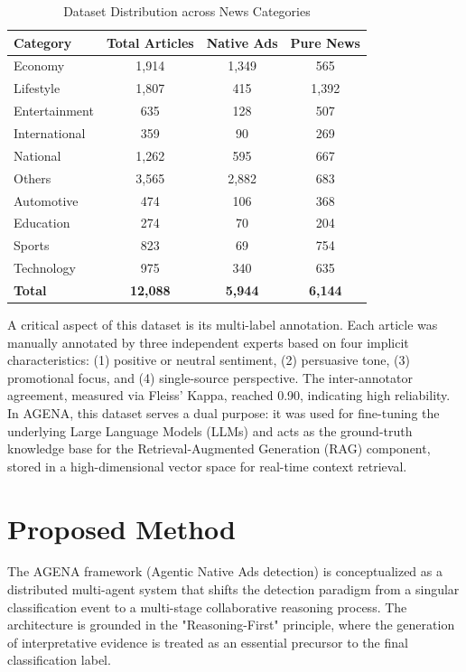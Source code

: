 \documentclass{ieeeaccess}
\begin{document}
\begin{table}[htbp]
\caption{Dataset Distribution across News Categories}
\label{tab:dataset_stats}
\begin{center}
\begin{tabular}{|l|c|c|c|}
\hline
\textbf{Category} & \textbf{Total Articles} & \textbf{Native Ads} & \textbf{Pure News} \\
\hline
Economy & 1,914 & 1,349 & 565 \\
Lifestyle & 1,807 & 415 & 1,392 \\
Entertainment & 635 & 128 & 507 \\
International & 359 & 90 & 269 \\
National & 1,262 & 595 & 667 \\
Others & 3,565 & 2,882 & 683 \\
Automotive & 474 & 106 & 368 \\
Education & 274 & 70 & 204 \\
Sports & 823 & 69 & 754 \\
Technology & 975 & 340 & 635 \\
\hline
\textbf{Total} & \textbf{12,088} & \textbf{5,944} & \textbf{6,144} \\
\hline
\end{tabular}
\end{center}
\end{table}

A critical aspect of this dataset is its multi-label annotation. Each article was manually annotated by three independent experts based on four implicit characteristics: (1) positive or neutral sentiment, (2) persuasive tone, (3) promotional focus, and (4) single-source perspective. The inter-annotator agreement, measured via Fleiss' Kappa, reached 0.90, indicating high reliability. In AGENA, this dataset serves a dual purpose: it was used for fine-tuning the underlying Large Language Models (LLMs) and acts as the ground-truth knowledge base for the Retrieval-Augmented Generation (RAG) component, stored in a high-dimensional vector space for real-time context retrieval.

\section{Proposed Method}
\label{sec:methods}
The AGENA framework (Agentic Native Ads detection) is conceptualized as a distributed multi-agent system that shifts the detection paradigm from a singular classification event to a multi-stage collaborative reasoning process. The architecture is grounded in the "Reasoning-First" principle, where the generation of interpretative evidence is treated as an essential precursor to the final classification label.
\end{document}
